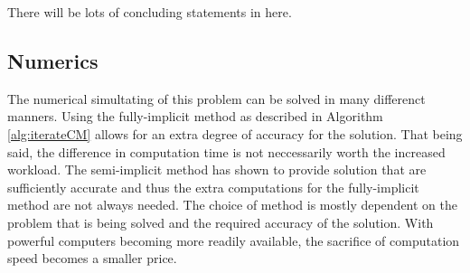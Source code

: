 There will be lots of concluding statements in here.

\subsection{Numerics}
   The numerical simultating of this problem can be solved in many differenct manners.
   Using the fully-implicit method as described in Algorithm \ref{alg:iterateCM} allows for an extra degree of accuracy for the solution.
   That being said, the difference in computation time is not neccessarily worth the increased workload.
   The semi-implicit method has shown to provide solution that are sufficiently accurate and thus the extra computations for the fully-implicit method are not always needed.
   The choice of method is mostly dependent on the problem that is being solved and the required accuracy of the solution.
   With powerful computers becoming more readily available, the sacrifice of computation speed becomes a smaller price.
 



